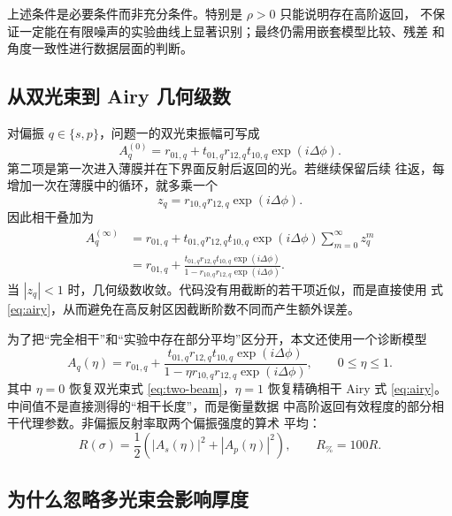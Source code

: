 \documentclass[UTF8,12pt,a4paper]{ctexart}
\begin{document}
上述条件是必要条件而非充分条件。特别是 $\rho>0$ 只能说明存在高阶返回，
不保证一定能在有限噪声的实验曲线上显著识别；最终仍需用嵌套模型比较、残差
和角度一致性进行数据层面的判断。

\subsection{从双光束到 Airy 几何级数}

对偏振 $q\in\{s,p\}$，问题一的双光束振幅可写成
\begin{equation}
  A_q^{(0)}=r_{01,q}+t_{01,q}r_{12,q}t_{10,q}
  \exp(i\Delta\phi).
  \label{eq:two-beam}
\end{equation}
第二项是第一次进入薄膜并在下界面反射后返回的光。若继续保留后续
往返，每增加一次在薄膜中的循环，就多乘一个
\begin{equation}
  z_q=r_{10,q}r_{12,q}\exp(i\Delta\phi).
  \label{eq:z}
\end{equation}
因此相干叠加为
\begin{align}
  A_q^{(\infty)}
  &=r_{01,q}+t_{01,q}r_{12,q}t_{10,q}
    \exp(i\Delta\phi)\sum_{m=0}^{\infty}z_q^m \\ 
  &=r_{01,q}+\frac{t_{01,q}r_{12,q}t_{10,q}
    \exp(i\Delta\phi)}{1-r_{10,q}r_{12,q}\exp(i\Delta\phi)}.
  \label{eq:airy}
\end{align}
当 $|z_q|<1$ 时，几何级数收敛。代码没有用截断的若干项近似，而是直接使用
式 \eqref{eq:airy}，从而避免在高反射区因截断阶数不同而产生额外误差。

为了把“完全相干”和“实验中存在部分平均”区分开，本文还使用一个诊断模型
\begin{equation}
  A_q(\eta)=r_{01,q}+\frac{t_{01,q}r_{12,q}t_{10,q}
  \exp(i\Delta\phi)}{1-\eta r_{10,q}r_{12,q}\exp(i\Delta\phi)},
  \qquad 0\leq\eta\leq1.
  \label{eq:partial}
\end{equation}
其中 $\eta=0$ 恢复双光束式 \eqref{eq:two-beam}，$\eta=1$ 恢复精确相干
Airy 式 \eqref{eq:airy}。中间值不是直接测得的“相干长度”，而是衡量数据
中高阶返回有效程度的部分相干代理参数。非偏振反射率取两个偏振强度的算术
平均：
\begin{equation}
  R(\sigma)=\frac{1}{2}\left(|A_s(\eta)|^2+|A_p(\eta)|^2\right),
  \qquad R_{\%}=100R.
  \label{eq:unpolarized}
\end{equation}

\subsection{为什么忽略多光束会影响厚度}
\end{document}

